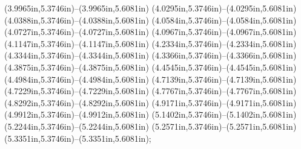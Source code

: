 (3.9965in,5.3746in)--(3.9965in,5.6081in) (4.0295in,5.3746in)--(4.0295in,5.6081in) (4.0388in,5.3746in)--(4.0388in,5.6081in) (4.0584in,5.3746in)--(4.0584in,5.6081in) (4.0727in,5.3746in)--(4.0727in,5.6081in) (4.0967in,5.3746in)--(4.0967in,5.6081in) (4.1147in,5.3746in)--(4.1147in,5.6081in) (4.2334in,5.3746in)--(4.2334in,5.6081in) (4.3344in,5.3746in)--(4.3344in,5.6081in) (4.3366in,5.3746in)--(4.3366in,5.6081in) (4.3875in,5.3746in)--(4.3875in,5.6081in) (4.4545in,5.3746in)--(4.4545in,5.6081in) (4.4984in,5.3746in)--(4.4984in,5.6081in) (4.7139in,5.3746in)--(4.7139in,5.6081in) (4.7229in,5.3746in)--(4.7229in,5.6081in) (4.7767in,5.3746in)--(4.7767in,5.6081in) (4.8292in,5.3746in)--(4.8292in,5.6081in) (4.9171in,5.3746in)--(4.9171in,5.6081in) (4.9912in,5.3746in)--(4.9912in,5.6081in) (5.1402in,5.3746in)--(5.1402in,5.6081in) (5.2244in,5.3746in)--(5.2244in,5.6081in) (5.2571in,5.3746in)--(5.2571in,5.6081in) (5.3351in,5.3746in)--(5.3351in,5.6081in);
